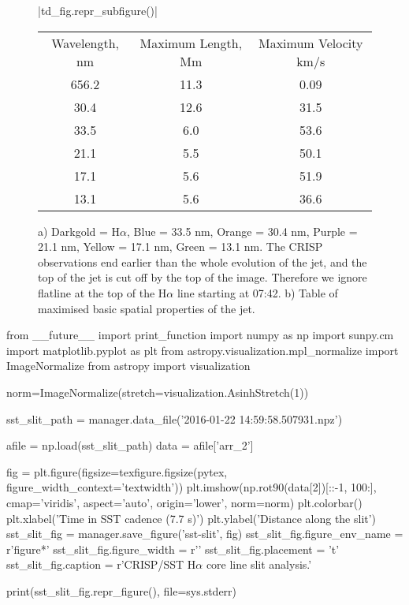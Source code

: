 \documentclass{emulateapj}
\begin{document}
\begin{figure}[t]
	\centering
	\py[T-D-plots]|td_fig.repr_subfigure()|
	
	\begin{subtable}[b]{0.5\textwidth}
		\centering
		\begin{tabular}{ccc}
		Wavelength, nm & Maximum Length, Mm & Maximum Velocity km/s \\
		656.2 & 11.3 & 0.09 \\
		30.4 & 12.6 & 31.5 \\
		33.5 & 6.0 & 53.6 \\
		21.1 & 5.5 & 50.1 \\
		17.1 & 5.6 & 51.9 \\
		13.1 & 5.6 & 36.6 \\
		\end{tabular}
		\caption{}
	\end{subtable}
	\caption{a) Darkgold = H$\alpha$, Blue = 33.5 nm, Orange = 30.4 nm, Purple = 21.1 nm, Yellow = 17.1 nm, Green = 13.1 nm. The CRISP observations end earlier than the whole evolution of the jet, and the top of the jet is cut off by the top of the image. Therefore we ignore flatline at the top of the H$\alpha$ line starting at 07:42. b) Table of maximised basic spatial properties of the jet.}
\end{figure}


\begin{pycode}
from __future__ import print_function
import numpy as np
import sunpy.cm
import matplotlib.pyplot as plt
from astropy.visualization.mpl_normalize import ImageNormalize 
from astropy import visualization

norm=ImageNormalize(stretch=visualization.AsinhStretch(1))

sst_slit_path = manager.data_file('2016-01-22 14:59:58.507931.npz')

afile = np.load(sst_slit_path)
data = afile['arr_2']

fig = plt.figure(figsize=texfigure.figsize(pytex, figure_width_context='textwidth'))
plt.imshow(np.rot90(data[2])[::-1, 100:], cmap='viridis', aspect='auto', origin='lower', norm=norm)
plt.colorbar()
plt.xlabel('Time in SST cadence (7.7 s)')
plt.ylabel('Distance along the slit')
sst_slit_fig = manager.save_figure('sst-slit', fig)
sst_slit_fig.figure_env_name = r'figure*'
sst_slit_fig.figure_width = r'\textwidth'
sst_slit_fig.placement = 't'
sst_slit_fig.caption = r'CRISP/SST H$\alpha$ core line slit analysis.'

print(sst_slit_fig.repr_figure(), file=sys.stderr)
\end{pycode}
\end{document}
